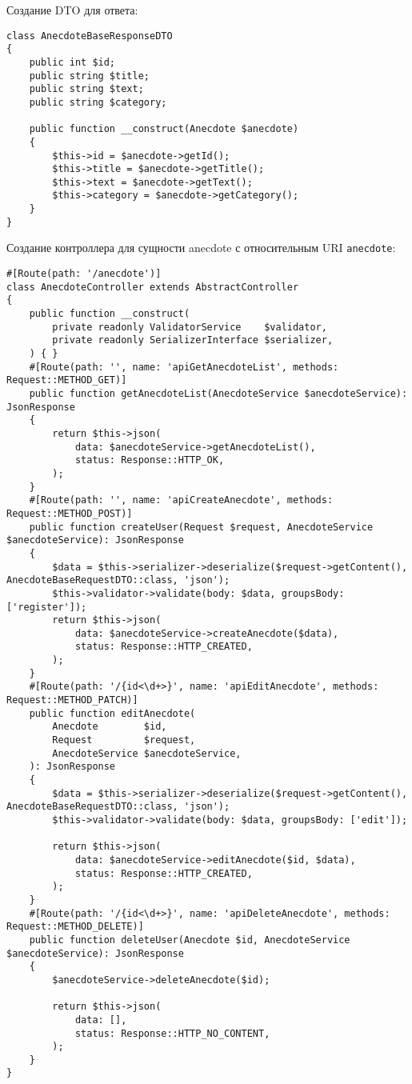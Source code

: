 \documentclass[pract]{SCWorks}
\begin{document}
Создание DTO для ответа:

\begin{verbatim}
class AnecdoteBaseResponseDTO
{
    public int $id;
    public string $title;
    public string $text;
    public string $category;

    public function __construct(Anecdote $anecdote)
    {
        $this->id = $anecdote->getId();
        $this->title = $anecdote->getTitle();
        $this->text = $anecdote->getText();
        $this->category = $anecdote->getCategory();
    }
}
\end{verbatim}

Создание контроллера для сущности anecdote с относительным URI 
\texttt{\/anecdote}:

\begin{verbatim}
#[Route(path: '/anecdote')]
class AnecdoteController extends AbstractController
{
    public function __construct(
        private readonly ValidatorService    $validator,
        private readonly SerializerInterface $serializer,
    ) { }
    #[Route(path: '', name: 'apiGetAnecdoteList', methods: Request::METHOD_GET)]
    public function getAnecdoteList(AnecdoteService $anecdoteService): JsonResponse
    {
        return $this->json(
            data: $anecdoteService->getAnecdoteList(),
            status: Response::HTTP_OK,
        );
    }
    #[Route(path: '', name: 'apiCreateAnecdote', methods: Request::METHOD_POST)]
    public function createUser(Request $request, AnecdoteService $anecdoteService): JsonResponse
    {
        $data = $this->serializer->deserialize($request->getContent(), AnecdoteBaseRequestDTO::class, 'json');
        $this->validator->validate(body: $data, groupsBody: ['register']);
        return $this->json(
            data: $anecdoteService->createAnecdote($data),
            status: Response::HTTP_CREATED,
        );
    }
    #[Route(path: '/{id<\d+>}', name: 'apiEditAnecdote', methods: Request::METHOD_PATCH)]
    public function editAnecdote(
        Anecdote        $id,
        Request         $request,
        AnecdoteService $anecdoteService,
    ): JsonResponse
    {
        $data = $this->serializer->deserialize($request->getContent(), AnecdoteBaseRequestDTO::class, 'json');
        $this->validator->validate(body: $data, groupsBody: ['edit']);

        return $this->json(
            data: $anecdoteService->editAnecdote($id, $data),
            status: Response::HTTP_CREATED,
        );
    }
    #[Route(path: '/{id<\d+>}', name: 'apiDeleteAnecdote', methods: Request::METHOD_DELETE)]
    public function deleteUser(Anecdote $id, AnecdoteService $anecdoteService): JsonResponse
    {
        $anecdoteService->deleteAnecdote($id);

        return $this->json(
            data: [],
            status: Response::HTTP_NO_CONTENT,
        );
    }
}
\end{verbatim}
\end{document}
